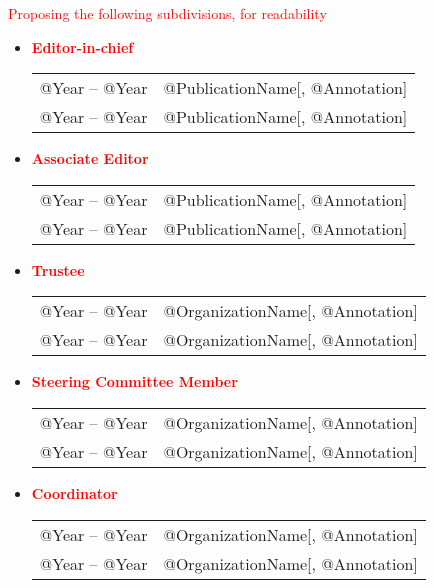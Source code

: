 \documentclass[10pt]{article}
\renewcommand{\new}[1]{\textcolor{red}{#1}}
\begin{document}
\new{Proposing the following subdivisions, for readability}

\begin{itemize}
\item[] \textbf{\new{Editor-in-chief}}
\\[1.3ex]
\begin{tabular}{l@{\quad\ }p{34em}} 
 @Year -- @Year 
 & @PublicationName[, @Annotation]
 \\[.5ex]
 @Year -- @Year 
 & @PublicationName[, @Annotation]
\end{tabular}

\item[] \textbf{\new{Associate Editor}}
\\[1.3ex]
\begin{tabular}{l@{\quad\ }p{34em}} 
 @Year -- @Year 
 & @PublicationName[, @Annotation]
 \\[.5ex]
 @Year -- @Year 
 & @PublicationName[, @Annotation]
\end{tabular}

\item[] \textbf{\new{Trustee}}
\\[1.3ex]
\begin{tabular}{l@{\quad\ }p{34em}} 
 @Year -- @Year 
 & @OrganizationName[, @Annotation]
 \\[.5ex]
 @Year -- @Year 
 & @OrganizationName[, @Annotation]
\end{tabular}

\item[] \textbf{\new{Steering Committee Member}}
\\[1.3ex]
\begin{tabular}{l@{\quad\ }p{34em}} 
 @Year -- @Year 
 & @OrganizationName[, @Annotation]
 \\[.5ex]
 @Year -- @Year 
 & @OrganizationName[, @Annotation]
\end{tabular}

\item[] \textbf{\new{Coordinator}}
\\[1.3ex]
\begin{tabular}{l@{\quad\ }p{34em}} 
 @Year -- @Year 
 & @OrganizationName[, @Annotation]
 \\[.5ex]
 @Year -- @Year 
 & @OrganizationName[, @Annotation]
\end{tabular}


\end{itemize}
\end{document}
